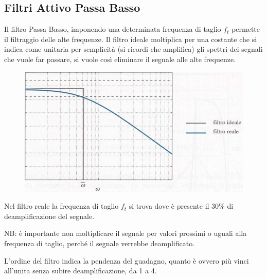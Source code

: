 \documentclass[a4paper, 15pt]{article}
\begin{document}
\subsection{Filtri Attivo Passa Basso}
\begin{adjustwidth}{2in}{}
   		Il filtro Passa Basso, imponendo una determinata frequenza di taglio $f_t$ permette il filtraggio delle alte frequenze. Il filtro ideale moltiplica per una costante che si indica come unitaria per semplicità (si ricordi che amplifica) gli spettri dei segnali che vuole far passare, si vuole così eliminare il segnale alle alte frequenze. 
\begin{figure}[H]
	\centering
	\includegraphics[width=0.5\linewidth]{immagini/screenshot002}
	\label{fig:screenshot002}
\end{figure}
   		Nel filtro reale la frequenza di taglio $f_t$ si trova dove è presente il 30\% di deamplificazione del segnale. 
   		
   		NB: è importante non moltiplicare il segnale per valori prossimi o uguali alla frequenza di taglio, perché il segnale verrebbe deamplificato. \newline 
   		
   		L'ordine del filtro indica la pendenza del guadagno, quanto è ovvero più vinci all'unita senza subire deamplificazione, da 1 a 4. 
   		\begin{figure}[H]
   			\centering
   		\end{figure}
   	   		

\end{adjustwidth}
\end{document}
